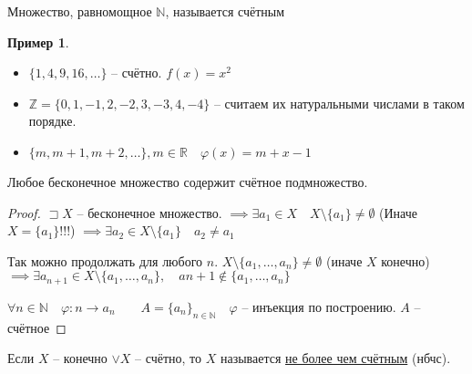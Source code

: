 \documentclass{book}
\newcommand\N{\ensuremath{\mathbb{N}}}
\newcommand\R{\ensuremath{\mathbb{R}}}
\newcommand\Z{\ensuremath{\mathbb{Z}}}
\renewcommand\O{\ensuremath{\emptyset}}
\renewcommand\phi{\varphi}
\theoremstyle{definition}
\newtheorem*{example}{Пример}
\begin{document}
    \begin{definition}
        Множество, равномощное $\N$, называется счётным
    \end{definition}
    \begin{example}
        \begin{itemize}
            \item $\{1, 4, 9, 16, \ldots\}$ -- счётно. 
            $f(x) = x^2$
            \item $\Z  = \{0,1,-1,2,-2,3,-3,4,-4\}$ -- считаем их натуральными числами  в таком порядке.
            \item $\{m, m+1, m+2, \ldots\}, m\in \R\quad \phi(x) = m+x-1$
        \end{itemize}
    \end{example}
    \begin{theorem}
        Любое бесконечное множество содержит счётное подмножество.
    \end{theorem}
    \begin{proof}
        $\sqsupset X$ -- бесконечное множество. $\implies  \exists a_1\in X\quad X\setminus \{a_1   \}\neq \O $ (Иначе $X = \{a_1\}$!!!) $\implies \exists a_2\in X\setminus \{a_1\}\quad a_2\neq a_1$

        Так можно продолжать для любого $n$. $X\setminus \{a_1, \ldots, a_n\}\neq \O $ (иначе $X$ конечно) $\implies \exists a_{n+1}\in X\setminus \{a_1, \ldots, a_n\}, \quad a{n+1}\not\in \{a_1, \ldots, a_n\}$

        $\forall n\in \N \quad \phi: n\to a_n\qquad A = \{a_n\}_{n\in \N }\quad \phi$ -- инъекция по построению. $A$ -- счётное
    \end{proof}

    \begin{definition}
        Если $X$ -- конечно $\vee X$ -- счётно, то $X$ называется \underline{не более чем счётным} (нбчс).
    \end{definition} 
\end{document}
